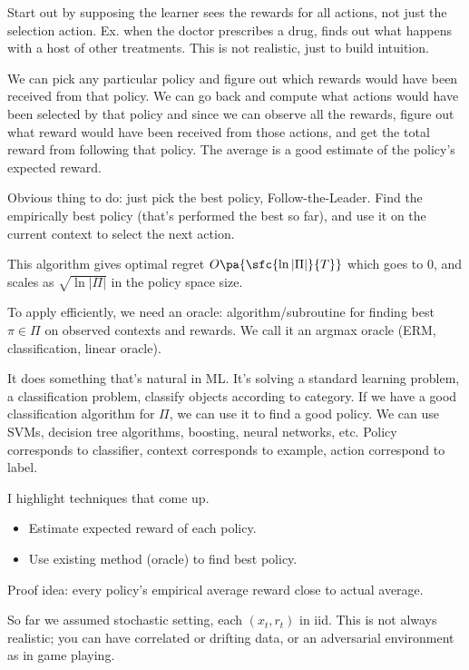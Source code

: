 Start out by supposing the learner sees the rewards for all actions, not just the selection action. Ex. when the doctor prescribes a drug, finds out what happens with a host of other treatments. This is not realistic, just to build intuition.


We can pick any particular policy and figure out which rewards would have been received from that policy. We can go back and compute what actions would have been selected by that policy and since we can observe all the rewards, figure out what reward would have been received from those actions, and get the total reward from following that policy. The average is a good estimate of the policy's expected reward.

Obvious thing to do: just pick the best policy, Follow-the-Leader.  Find the empirically best policy (that's performed the best so far), and use it on the current context to select the next action.

This algorithm gives optimal regret $O\pa{\sfc{\ln |\Pi|}{T}}$ which goes to 0, and scales as $\sqrt{\ln |\Pi|}$ in the policy space size.

To apply efficiently, we need an oracle: algorithm/subroutine for finding best $\pi\in \Pi$ on observed contexts and rewards.
We call it an argmax oracle (ERM, classification, linear oracle).

It does something that's natural in ML. It's solving a standard learning problem, a classification problem, classify objects according to category. If we have a good classification algorithm for $\Pi$, we can use it to find a good policy. We can use SVMs, decision tree algorithms, boosting, neural networks, etc. %
Policy corresponds to classifier, context corresponds to example, action correspond to label.

I highlight techniques that come up. 
\begin{itemize}
\item
Estimate expected reward of each policy.
\item
Use existing method (oracle) to find best policy.
\end{itemize}

Proof idea: every policy's empirical average reward close to actual average.

So far we assumed stochastic setting, each $(x_t,r_t)$ in iid. This is not always realistic; you can have correlated or drifting data, or an adversarial environment as in game playing.

